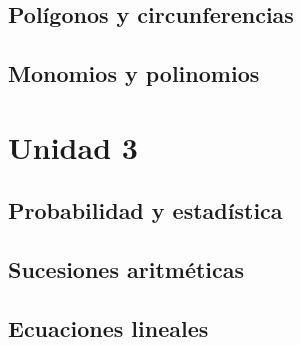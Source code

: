 \documentclass[examen]{RDS_unit}
\begin{document}
\begin{questions}


\newpage
 \subsection{Polígonos y circunferencias}
   



 \subsection{Monomios y polinomios}
   

	\section{Unidad 3}

    \subsection{Probabilidad y estadística}
	


   
% 

\subsection{Sucesiones aritméticas}




\newpage
\subsection{Ecuaciones lineales}



  \end{questions}
\end{document}

